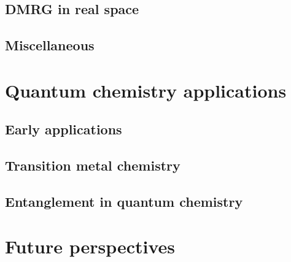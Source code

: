 \documentclass[letterpaper,12pt]{article}
\begin{document}
\subsection{DMRG in real space}

\subsection{Miscellaneous}

\section{Quantum chemistry applications}

\subsection{Early applications}

\subsection{Transition metal chemistry}

\subsection{Entanglement in quantum chemistry}

\section{Future perspectives}
\end{document}
